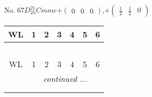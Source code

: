 \documentclass[fleqn,9pt,landscape]{jsarticle}
\begin{document}
\newpage
No. 67\quad$D_{2h}^{21}$\quad$Cmme$\quad[ orthorhombic ]\quad$+\begin{pmatrix} 0 & 0 & 0 \end{pmatrix}$,\quad $+\begin{pmatrix} \frac{1}{2} & \frac{1}{2} & 0 \end{pmatrix}$
\begin{center}
\renewcommand{\arraystretch}{1.2}
\begin{longtable}{ccccccc}
 \hline \hline
WL & 1 & 2 & 3 & 4 & 5 & 6 \\ \hline \endfirsthead

\multicolumn{6}{l}{\tablename\ \thetable{}} \\
 \hline \hline
WL & 1 & 2 & 3 & 4 & 5 & 6 \\ \hline \endhead

 \hline \hline
\multicolumn{6}{r}{\footnotesize\it continued ...} \\ \endfoot

 \hline \hline
\multicolumn{6}{r}{} \\ \endlastfoot


\end{longtable}
\end{center}
\end{document}
